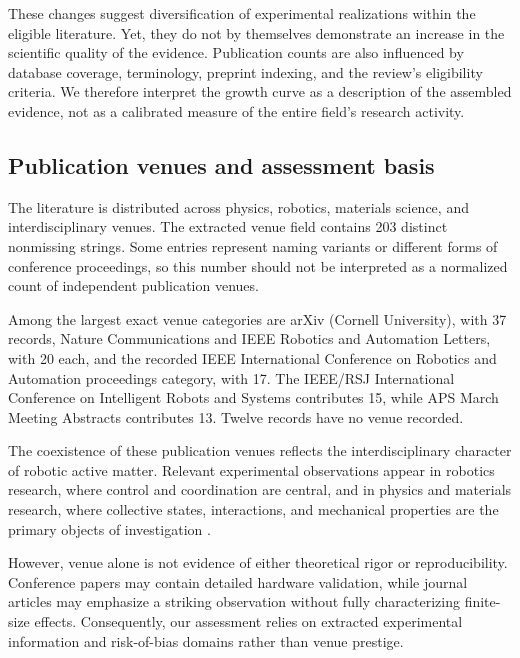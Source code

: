 These changes suggest diversification of experimental realizations within the eligible literature. Yet, they do not by themselves demonstrate an increase in the scientific quality of the evidence. Publication counts are also influenced by database coverage, terminology, preprint indexing, and the review's eligibility criteria. We therefore interpret the growth curve as a description of the assembled evidence, not as a calibrated measure of the entire field's research activity.

\subsection{Publication venues and assessment basis}
\label{sec:results-venues}

The literature is distributed across physics, robotics, materials science, and interdisciplinary venues. The extracted venue field contains 203 distinct nonmissing strings. Some entries represent naming variants or different forms of conference proceedings, so this number should not be interpreted as a normalized count of independent publication venues.

Among the largest exact venue categories are arXiv (Cornell University), with 37 records, Nature Communications and IEEE Robotics and Automation Letters, with 20 each, and the recorded IEEE International Conference on Robotics and Automation proceedings category, with 17. The IEEE/RSJ International Conference on Intelligent Robots and Systems contributes 15, while APS March Meeting Abstracts contributes 13. Twelve records have no venue recorded.

The coexistence of these publication venues reflects the interdisciplinary character of robotic active matter. Relevant experimental observations appear in robotics research, where control and coordination are central, and in physics and materials research, where collective states, interactions, and mechanical properties are the primary objects of investigation \cite{Vsrhelyi2018optimizedflockingo,Savoie2019arobotmadeofrobo,Boudet2021fromcollectionsof,Berlinger2021implicitcoordinatio,Zion2023morphologicalcomput,Taghavi2024coordinatedbehavior,Ma2026crosslinkcollectiv,Paramanick2025spontaneousemergenc,Deblais2018boundariescontrolc,Jianchao2024emergentchiralitya,Xia2024biomimeticsynchroni,Wang2025hyperuniformnetwork}.

However, venue alone is not evidence of either theoretical rigor or reproducibility. Conference papers may contain detailed hardware validation, while journal articles may emphasize a striking observation without fully characterizing finite-size effects. Consequently, our assessment relies on extracted experimental information and risk-of-bias domains rather than venue prestige.

